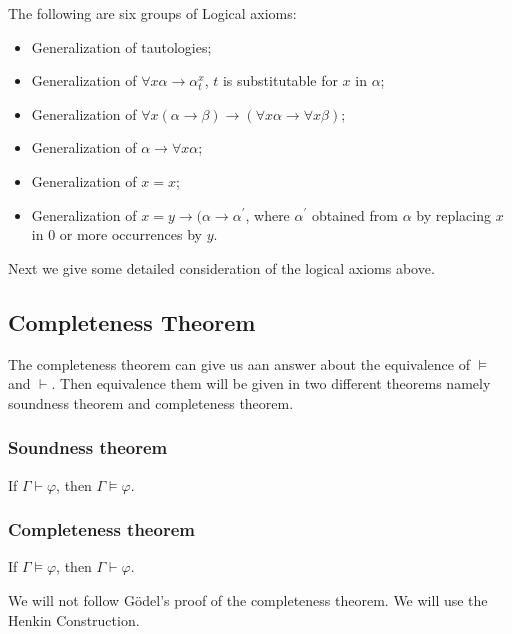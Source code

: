 \documentclass[11pt]{article}
\begin{document}
\begin{definition}
The following are six groups of Logical axioms:
\begin{itemize}
\item Generalization of tautologies;
\item Generalization of \(\forall x\alpha \to \alpha^x_t\), \(t\) is substitutable for \(x\) in \(\alpha\);
\item Generalization of \(\forall x(\alpha \to \beta) \to (\forall x\alpha \to \forall x\beta)\);
\item Generalization of \(\alpha \to \forall x\alpha\);
\item Generalization of \(x = x\);
\item Generalization of \(x = y \to (\alpha \to \alpha^{\prime}\), where \(\alpha^{\prime}\) obtained from \(\alpha\) by replacing \(x\) in 0 or more occurrences by \(y\).
\end{itemize}
\end{definition}

Next we give some detailed consideration of the logical axioms above.
\subsection{Completeness Theorem}
\label{sec:orgfb9d66c}
The completeness theorem can give us aan answer about the equivalence of \(\models\) and \(\vdash\). Then equivalence them will be given in two different theorems namely soundness theorem and completeness theorem.
\subsubsection{Soundness theorem}
\label{sec:orga7cfc8d}

\begin{theorem}
If \(\Gamma \vdash \varphi\), then \(\Gamma \models \varphi\).
\end{theorem}
\subsubsection{Completeness theorem}
\label{sec:org7e4169a}

\begin{theorem}
If \(\Gamma \models \varphi\), then \(\Gamma \vdash \varphi\).
\end{theorem}

We will not follow Gödel's proof of the completeness theorem. We will use the Henkin Construction.
\end{document}

